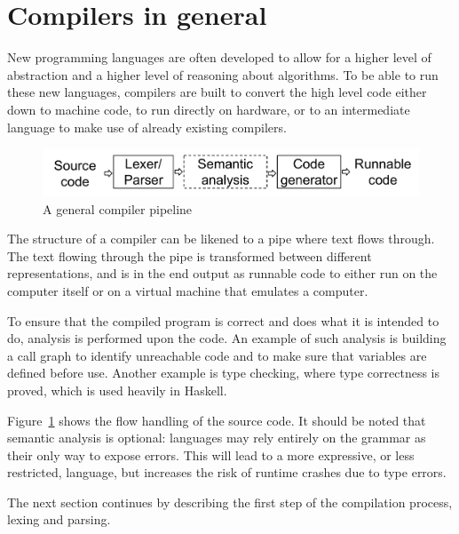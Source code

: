 \section{Compilers in general}

New programming languages are often developed to allow for a higher level of abstraction and a higher level of reasoning about algorithms. To be able to run these new languages, compilers are built to convert the high level code either down to machine code, to run directly on hardware, or to an intermediate language to make use of already existing compilers.

\begin{figure}[!ht]
  \centering
  \includegraphics[width=0.6\pdfpagewidth]{figure/generalpipeline}
  \caption{A general compiler pipeline}
  \label{fig:generalpipeline}
\end{figure}

The structure of a compiler can be likened to a pipe where text flows through. The text flowing through the pipe is transformed between different representations, and is in the end output as runnable code to either run on the computer itself or on a virtual machine that emulates a computer. 

To ensure that the compiled program is correct and does what it is intended to do, analysis is performed upon the code. An example of such analysis is building a call graph to identify unreachable code and to make sure that variables are defined before use. Another example is type checking, where type correctness is proved, which is used heavily in Haskell.

Figure~\ref{fig:generalpipeline} shows the flow handling of the source code. It should be noted that semantic analysis is optional: languages may rely entirely on the grammar as their only way to expose errors. This will lead to a more expressive, or less restricted, language, but increases the risk of runtime crashes due to type errors.

The next section continues by describing the first step of the compilation process, lexing and parsing.
